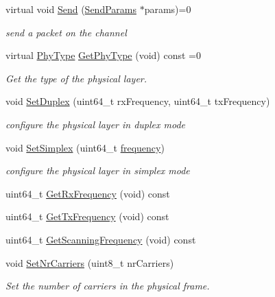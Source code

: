 \begin{DoxyCompactItemize}
virtual void \hyperlink{classns3_1_1WimaxPhy_a69973a182a804ae34ee64caef343b4db}{Send} (\hyperlink{classns3_1_1SendParams}{Send\+Params} $\ast$params)=0
\begin{DoxyCompactList}\small\item\em send a packet on the channel \end{DoxyCompactList}\item 
virtual \hyperlink{classns3_1_1WimaxPhy_a30c76d3d1853c49c26edef12338cf6b4}{Phy\+Type} \hyperlink{classns3_1_1WimaxPhy_ae4025d2d699b01ef4706c25f7c978719}{Get\+Phy\+Type} (void) const =0
\begin{DoxyCompactList}\small\item\em Get the type of the physical layer. \end{DoxyCompactList}\item 
void \hyperlink{classns3_1_1WimaxPhy_a25d2e64c19f39eb627d970eecaf7f6f5}{Set\+Duplex} (uint64\+\_\+t rx\+Frequency, uint64\+\_\+t tx\+Frequency)
\begin{DoxyCompactList}\small\item\em configure the physical layer in duplex mode \end{DoxyCompactList}\item 
void \hyperlink{classns3_1_1WimaxPhy_aa67efa49cb4e9c71b48264a5a24386a5}{Set\+Simplex} (uint64\+\_\+t \hyperlink{mmwave_2model_2fading-traces_2fading__trace__generator_8m_a09045328d6d7e16aa4013f526cc6993d}{frequency})
\begin{DoxyCompactList}\small\item\em configure the physical layer in simplex mode \end{DoxyCompactList}\item 
uint64\+\_\+t \hyperlink{classns3_1_1WimaxPhy_a31607cbe5be12918000ab3ae05404c26}{Get\+Rx\+Frequency} (void) const 
\item 
uint64\+\_\+t \hyperlink{classns3_1_1WimaxPhy_a57f8a4af9386d9a0e3192f95a3904283}{Get\+Tx\+Frequency} (void) const 
\item 
uint64\+\_\+t \hyperlink{classns3_1_1WimaxPhy_abf07e17a023bcc41d7f86404ed7d0b51}{Get\+Scanning\+Frequency} (void) const 
\item 
void \hyperlink{classns3_1_1WimaxPhy_a761359e72d78bd1011a47388c89f4fbe}{Set\+Nr\+Carriers} (uint8\+\_\+t nr\+Carriers)
\begin{DoxyCompactList}\small\item\em Set the number of carriers in the physical frame. \end{DoxyCompactList}\item 

\end{DoxyCompactItemize}
